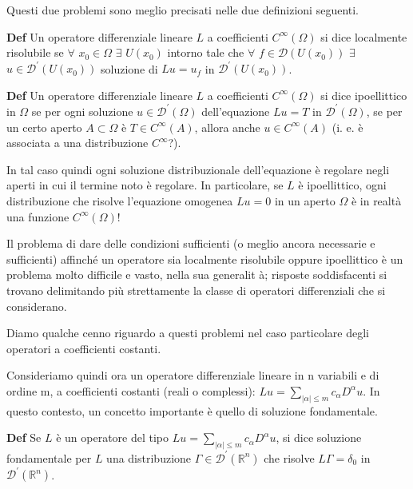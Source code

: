 \documentclass{article}
\begin{document}
Questi due problemi sono meglio precisati nelle due definizioni seguenti.

\textbf{Def} Un operatore differenziale lineare $L$ a coefficienti $%
C^{\infty }\left( \Omega \right) $ si dice localmente risolubile se $\forall 
$ $x_{0}\in \Omega $ $\exists $ $U(x_{0})$ intorno tale che $\forall $ $f\in 
\mathcal{D}\left( U\left( x_{0}\right) \right) $ $\exists $ $u\in \mathcal{D}%
^{\prime }(U\left( x_{0}\right) )$ soluzione di $Lu=u_{f}$ in $\mathcal{D}%
^{\prime }(U\left( x_{0}\right) )$.

\textbf{Def} Un operatore differenziale lineare $L$ a coefficienti $%
C^{\infty }\left( \Omega \right) $ si dice ipoellittico in $%
\Omega
$ se per ogni soluzione $u\in \mathcal{D}^{\prime }(%
\Omega
)$ dell'equazione $Lu=T$ in $\mathcal{D}^{\prime }(%
\Omega
)$, se per un certo aperto $A\subset 
\Omega
$ \`{e} $T\in C^{\infty }\left( A\right) $, allora anche $u\in C^{\infty
}\left( A\right) $ (i. e. \`{e} associata a una distribuzione $C^{\infty }$?).

In tal caso quindi ogni soluzione distribuzionale dell'equazione \`{e}
regolare negli aperti in cui il termine noto \`{e} regolare. In particolare,
se $L$ \`{e} ipoellittico, ogni distribuzione che risolve l'equazione
omogenea $Lu=0$ in un aperto $%
\Omega
$ \`{e} in realt\`{a} una funzione $C^{\infty }\left( \Omega \right) $!

Il problema di dare delle condizioni sufficienti (o meglio ancora necessarie
e sufficienti) affinch\'{e} un operatore sia localmente risolubile oppure
ipoellittico \`{e} un problema molto difficile e vasto, nella sua generalit%
\`{a}; risposte soddisfacenti si trovano delimitando pi\`{u} strettamente la
classe di operatori differenziali che si considerano.

Diamo qualche cenno riguardo a questi problemi nel caso particolare degli
operatori a coefficienti costanti.

Consideriamo quindi ora un operatore differenziale lineare in n variabili e
di ordine m, a coefficienti costanti (reali o complessi): $%
Lu=\sum_{\left\vert \alpha \right\vert \leq m}c_{\alpha }D^{\alpha }u$. In
questo contesto, un concetto importante \`{e} quello di soluzione
fondamentale.

\textbf{Def} Se $L$ \`{e} un operatore del tipo $Lu=\sum_{\left\vert \alpha
\right\vert \leq m}c_{\alpha }D^{\alpha }u$, si dice soluzione fondamentale
per $L$ una distribuzione $\Gamma \in \mathcal{D}^{\prime }\left( 
\mathbb{R}
^{n}\right) $ che risolve $L\Gamma =\delta _{0}$ in $\mathcal{D}^{\prime
}\left( 
\mathbb{R}
^{n}\right) $.
\end{document}
